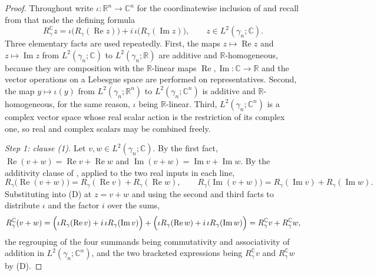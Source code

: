 \begin{proof}
Throughout write $\iota : \mathbb{R}^n \to \mathbb{C}^n$ for the coordinatewise
inclusion of  and recall from that node the
defining formula
\begin{equation*}
  R_\gamma^{\mathbb{C}} z
    = \iota\bigl(R_\gamma(\operatorname{Re} z)\bigr)
      + i\,\iota\bigl(R_\gamma(\operatorname{Im} z)\bigr),
  \qquad z \in L^2(\gamma_n;\mathbb{C}) . \tag{D}
\end{equation*}
Three elementary facts are used repeatedly.  First, the maps
$z \mapsto \operatorname{Re} z$ and $z \mapsto \operatorname{Im} z$ from
$L^2(\gamma_n;\mathbb{C})$ to $L^2(\gamma_n;\mathbb{R})$ are additive and
$\mathbb{R}$-homogeneous, because they are composition with the
$\mathbb{R}$-linear maps $\operatorname{Re}, \operatorname{Im} : \mathbb{C} \to
\mathbb{R}$ and the vector operations on a Lebesgue space are performed on
representatives.  Second, the map $y \mapsto \iota(y)$ from
$L^2(\gamma_n;\mathbb{R}^n)$ to $L^2(\gamma_n;\mathbb{C}^n)$ is additive and
$\mathbb{R}$-homogeneous, for the same reason, $\iota$ being
$\mathbb{R}$-linear.  Third, $L^2(\gamma_n;\mathbb{C}^n)$ is a complex vector
space whose real scalar action is the restriction of its complex one, so real
and complex scalars may be combined freely.

\emph{Step 1: clause (1).}
Let $v, w \in L^2(\gamma_n;\mathbb{C})$.  By the first fact,
$\operatorname{Re}(v+w) = \operatorname{Re} v + \operatorname{Re} w$ and
$\operatorname{Im}(v+w) = \operatorname{Im} v + \operatorname{Im} w$.  By the
additivity clause of , applied to the two real
inputs in each line,
\[
  R_\gamma\bigl(\operatorname{Re}(v+w)\bigr)
    = R_\gamma(\operatorname{Re} v) + R_\gamma(\operatorname{Re} w),
  \qquad
  R_\gamma\bigl(\operatorname{Im}(v+w)\bigr)
    = R_\gamma(\operatorname{Im} v) + R_\gamma(\operatorname{Im} w).
\]
Substituting into (D) at $z = v + w$ and using the second and third facts to
distribute $\iota$ and the factor $i$ over the sums,
\[
  R_\gamma^{\mathbb{C}}(v+w)
    = \Bigl(\iota R_\gamma(\operatorname{Re} v)
        + i\,\iota R_\gamma(\operatorname{Im} v)\Bigr)
      + \Bigl(\iota R_\gamma(\operatorname{Re} w)
        + i\,\iota R_\gamma(\operatorname{Im} w)\Bigr)
    = R_\gamma^{\mathbb{C}} v + R_\gamma^{\mathbb{C}} w ,
\]
the regrouping of the four summands being commutativity and associativity of
addition in $L^2(\gamma_n;\mathbb{C}^n)$, and the two bracketed expressions
being $R_\gamma^{\mathbb{C}} v$ and $R_\gamma^{\mathbb{C}} w$ by (D).


\end{proof}
